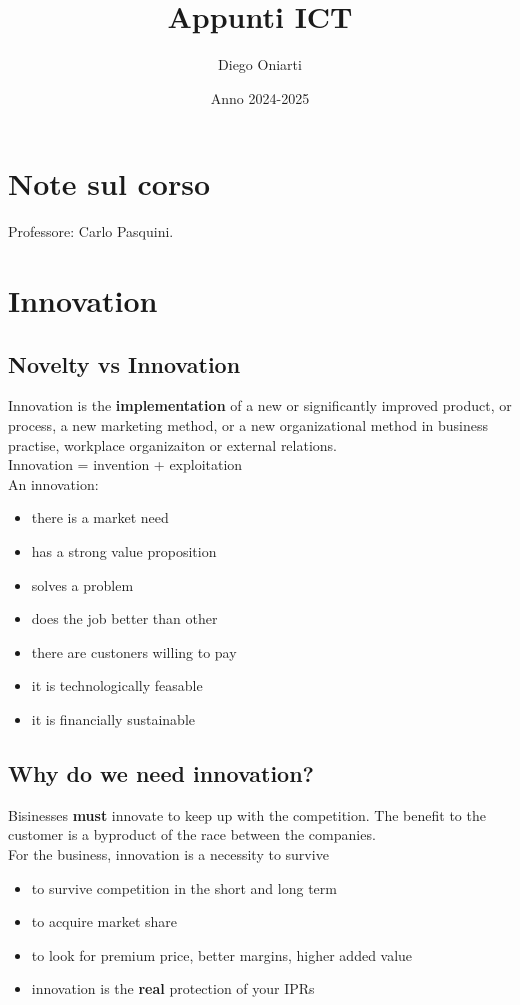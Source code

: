 \documentclass{article}
\title{Appunti ICT}
\author{Diego Oniarti}
\date{Anno 2024-2025}
\begin{document}
\maketitle
\tableofcontents

\section{Note sul corso}
Professore: Carlo Pasquini.

\section{Innovation}
\subsection{Novelty vs Innovation}
Innovation is the \textbf{implementation} of a new or significantly improved product, or process, a new marketing method, or a new organizational method in business practise, workplace organizaiton or external relations. \\
Innovation = invention + exploitation \\
An innovation:
\begin{itemize}
    \item there is a market need
    \item has a strong value proposition
    \item solves a problem
    \item does the job better than other
    \item there are custoners willing to pay
    \item it is technologically feasable
    \item it is financially sustainable
\end{itemize}

\subsection{Why do we need innovation?}
Bisinesses \textbf{must} innovate to keep up with the competition. The benefit to the customer is a byproduct of the race between the companies. \\
For the business, innovation is a necessity to survive
\begin{itemize}
    \item to survive competition in the short and long term
    \item to acquire market share
    \item to look for premium price, better margins, higher added value
    \item innovation is the \textbf{real} protection of your IPRs
\end{itemize}
\end{document}
